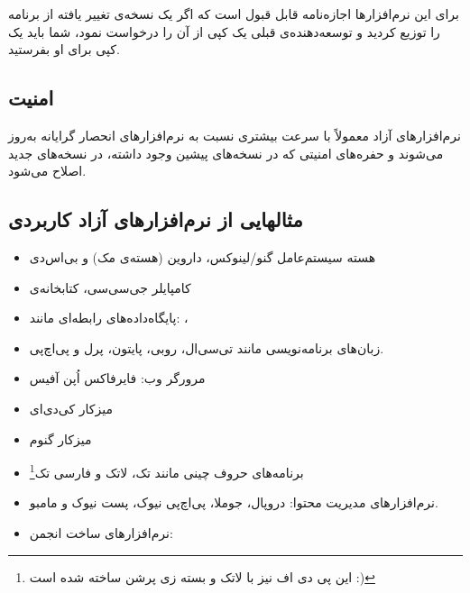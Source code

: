 برای این نرم‌افزارها اجازه‌نامه قابل قبول است که اگر یک نسخه‌ی تغییر یافته از برنامه را توزیع کردید و توسعه‌دهنده‌ی قبلی یک کپی از آن را درخواست نمود، شما باید یک کپی برای او بفرستید.
\subsection*{امنیت}
نرم‌افزارهای آزاد معمولاً با سرعت بیشتری نسبت به نرم‌افزارهای انحصار گرایانه به‌روز می‌شوند و حفره‌های امنیتی که در نسخه‌های پیشین وجود داشته، در نسخه‌های جدید اصلاح می‌شود.
\subsection*{مثالهایی از نرم‌افزارهای آزاد کاربردی}
\begin{itemize}
\item هسته سیستم‌عامل گنو/لینوکس، داروین (هسته‌ی مک) و بی‌اس‌دی
\item کامپایلر جی‌سی‌سی، کتابخانه‌ی 
\item پایگاه‌داده‌های رابطه‌ای مانند:
	، 
\item زبان‌های برنامه‌نویسی مانند تی‌سی‌ال، روبی، پایتون، پرل و پی‌اچ‌پی.
\item مرورگر وب: فایرفاکس
	اُپن آفیس
\item میزکار کی‌دی‌ای
\item میزکار گنوم
\item برنامه‌های حروف چینی مانند تک، لاتک و فارسی تک\footnote{این پی دی اف نیز با لاتک و بسته زی پرشن ساخته شده است :)}
\item نرم‌افزارهای مدیریت محتوا: دروپال، جوملا، پی‌اچ‌پی نیوک، پست نیوک و مامبو.
\item نرم‌افزارهای ساخت انجمن: 
\end{itemize}
